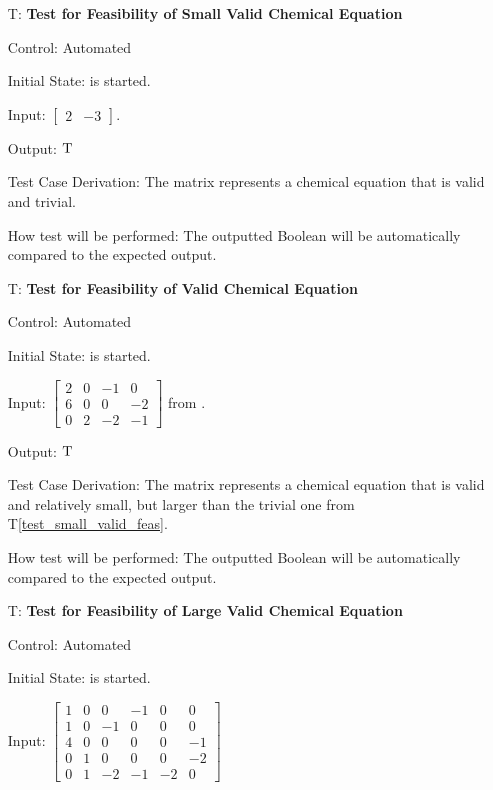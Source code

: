 \documentclass[12pt, titlepage]{article}
\newcounter{testnum} %
\newcommand{\testref}[1]{T\ref{#1}}
\begin{document}
\begin{enumerate}

  \item[T\refstepcounter{testnum}\thetestnum \label{test_small_valid_feas}:]
    \textbf{Test for Feasibility of Small Valid Chemical Equation}

    Control: Automated

    Initial State: \progname{} is started.

    Input: $\begin{bmatrix}
        2 & -3
      \end{bmatrix}$.

    Output: $\textsc{T}$

    Test Case Derivation: The matrix represents a chemical equation that is
    valid and trivial.

    How test will be performed: The outputted Boolean will be automatically
    compared to the expected output.

  \item[T\refstepcounter{testnum}\thetestnum \label{test_valid_feas}:]
    \textbf{Test for Feasibility of Valid Chemical Equation}

    Control: Automated

    Initial State: \progname{} is started.

    Input:
    $\begin{bmatrix}
        2 & 0 & -1 & 0  \\
        6 & 0 & 0  & -2 \\
        0 & 2 & -2 & -1
      \end{bmatrix}$ from \cite{hamid_balancing_2019}.

    Output: $\textsc{T}$

    Test Case Derivation: The matrix represents a chemical equation that is
    valid and relatively small, but larger than the trivial one from
    \testref{test_small_valid_feas}.

    How test will be performed: The outputted Boolean will be automatically
    compared to the expected output.

  \item[T\refstepcounter{testnum}\thetestnum \label{test_large_valid_feas}:]
    \textbf{Test for Feasibility of Large Valid Chemical Equation}

    Control: Automated

    Initial State: \progname{} is started.

    Input: $\begin{bmatrix}
        1 & 0 & 0  & -1 & 0  & 0  \\
        1 & 0 & -1 & 0  & 0  & 0  \\
        4 & 0 & 0  & 0  & 0  & -1 \\
        0 & 1 & 0  & 0  & 0  & -2 \\
        0 & 1 & -2 & -1 & -2 & 0
      \end{bmatrix}$


\end{enumerate}
\end{document}

